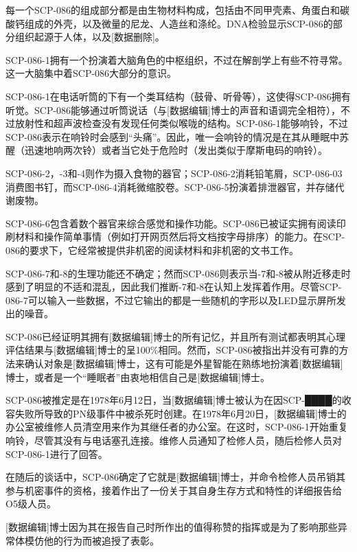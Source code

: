 每一个SCP-086的组成部分都是由生物材料构成，包括由不同甲壳素、角蛋白和碳酸钙组成的外壳，以及微量的尼龙、人造丝和涤纶。DNA检验显示SCP-086的部分组织起源于人体，以及{[}数据删除]。

SCP-086-1拥有一个扮演着大脑角色的中枢组织，不过在解剖学上有些不符寻常。这一大脑集中着SCP-086大部分的意识。

SCP-086-1在电话听筒的下有一个类耳结构（鼓骨、听骨等），这使得SCP-086拥有听觉。SCP-086能够通过听筒说话（与{[}数据编辑]博士的声音和语调完全相符），不过放射性和超声波检查没有发现任何类似喉咙的结构。SCP-086-1能够响铃，不过SCP-086表示在响铃时会感到“头痛”。因此，唯一会响铃的情况是在其从睡眠中苏醒（迅速地响两次铃）或者当它处于危险时（发出类似于摩斯电码的响铃）。

SCP-086-2，-3和-4则作为摄入食物的器官；SCP-086-2消耗铅笔屑，SCP-086-03消费图书钉，而SCP-086-4消耗微缩胶卷。SCP-086-5扮演着排泄器官，并存储代谢废物。

SCP-086-6包含着数个器官来综合感觉和操作功能。SCP-086已被证实拥有阅读印刷材料和操作简单事情（例如打开网页然后将文档按字母排序）的能力。在SCP-086的要求下，它经常被提供非机密的阅读材料和非机密的文书工作。

SCP-086-7和-8的生理功能还不确定；然而SCP-086则表示当-7和-8被从附近移走时感到了明显的不适和混乱，因此我们推断-7和-8在认知上发挥着作用。尽管SCP-086-7可以输入一些数据，不过它输出的都是一些随机的字形以及LED显示屏所发出的噪音。

SCP-086已经证明其拥有{[}数据编辑]博士的所有记忆，并且所有测试都表明其心理评估结果与{[}数据编辑]博士的呈100\%相同。然而，SCP-086被指出并没有可靠的方法来确认对象是{[}数据编辑]博士，这有可能是外星智能在熟练地扮演着{[}数据编辑]博士，或者是一个“睡眠者”由衷地相信自己是{[}数据编辑]博士。


SCP-086被推定是在1978年6月12日，当{[}数据编辑]博士被认为在因SCP-████的收容失败所导致的PN级事件中被杀死时创建。在1978年6月20日，{[}数据编辑]博士的办公室被维修人员清空用来作为其继任者的办公室。在这时，SCP-086-1开始重复响铃，尽管其没有与电话塞孔连接。维修人员通知了检修人员，随后检修人员对SCP-086-1进行了回答。

在随后的谈话中，SCP-086确定了它就是{[}数据编辑]博士，并命令检修人员吊销其参与机密事件的资格，接着作出了一份关于其自身生存方式和特性的详细报告给O5级人员。

{[}数据编辑]博士因为其在报告自己时所作出的值得称赞的指挥或是为了影响那些异常体模仿他的行为而被追授了表彰。


